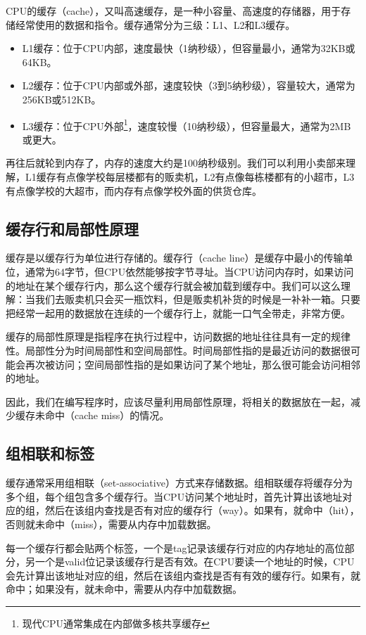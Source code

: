 CPU的缓存（cache），又叫高速缓存，是一种小容量、高速度的存储器，用于存储经常使用的数据和指令。缓存通常分为三级：L1、L2和L3缓存。
\begin{itemize}
  \item L1缓存：位于CPU内部，速度最快（1纳秒级），但容量最小，通常为32KB或64KB。
  \item L2缓存：位于CPU内部或外部，速度较快（3到5纳秒级），容量较大，通常为256KB或512KB。
  \item L3缓存：位于CPU外部\footnote{现代CPU通常集成在内部做多核共享缓存}，速度较慢（10纳秒级），但容量最大，通常为2MB或更大。
\end{itemize}
再往后就轮到内存了，内存的速度大约是100纳秒级别。我们可以利用小卖部来理解，L1缓存有点像学校每层楼都有的贩卖机，L2有点像每栋楼都有的小超市，L3有点像学校的大超市，而内存有点像学校外面的供货仓库。

\subsection{缓存行和局部性原理}

缓存是以缓存行为单位进行存储的。缓存行（cache line）是缓存中最小的传输单位，通常为64字节，但CPU依然能够按字节寻址。当CPU访问内存时，如果访问的地址在某个缓存行内，那么这个缓存行就会被加载到缓存中。我们可以这么理解：当我们去贩卖机只会买一瓶饮料，但是贩卖机补货的时候是一补补一箱。只要把经常一起用的数据放在连续的一个缓存行上，就能一口气全带走，非常方便。

缓存的局部性原理是指程序在执行过程中，访问数据的地址往往具有一定的规律性。局部性分为时间局部性和空间局部性。时间局部性指的是最近访问的数据很可能会再次被访问；空间局部性指的是如果访问了某个地址，那么很可能会访问相邻的地址。

因此，我们在编写程序时，应该尽量利用局部性原理，将相关的数据放在一起，减少缓存未命中（cache miss）的情况。

\subsection{组相联和标签}

缓存通常采用组相联（set-associative）方式来存储数据。组相联缓存将缓存分为多个组，每个组包含多个缓存行。当CPU访问某个地址时，首先计算出该地址对应的组，然后在该组内查找是否有对应的缓存行（way）。如果有，就命中（hit），否则就未命中（miss），需要从内存中加载数据。

每一个缓存行都会贴两个标签，一个是tag记录该缓存行对应的内存地址的高位部分，另一个是valid位记录该缓存行是否有效。在CPU要读一个地址的时候，CPU会先计算出该地址对应的组，然后在该组内查找是否有有效的缓存行。如果有，就命中；如果没有，就未命中，需要从内存中加载数据。

